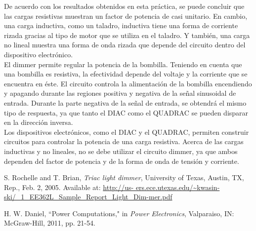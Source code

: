 \documentclass[journal]{IEEEtran}
\begin{document}
De acuerdo con los resultados obtenidos en esta práctica, 
se puede concluir que las cargas resistivas muestran 
un factor de potencia de 
casi unitario. En cambio, una carga inductiva, como un 
taladro, inductiva tiene una forma de 
corriente rizada gracias al tipo de motor que se 
utiliza en el taladro. Y también, una carga no lineal 
muestra una forma de onda rizada que depende del circuito 
dentro del dispositivo electrónico. \\

El dimmer permite regular la potencia de la bombilla. 
Teniendo en cuenta que una bombilla es resistiva, la 
efectividad depende del voltaje y la corriente que se 
encuentra en éste. El circuito controla la alimentación 
de la bombilla 
encendiendo y apagando durante las regiones positiva y 
negativa de la señal sinusoidal de entrada. Durante 
la parte negativa de la señal de entrada, se obtendrá 
el mismo tipo de respuesta, ya que tanto el DIAC como 
el QUADRAC se pueden disparar en la dirección inversa. \\

Los dispositivos electrónicos, como el DIAC y el QUADRAC, 
permiten construir circuitos para controlar la potencia 
de una carga resistiva.
Acerca de las cargas inductivas y no lineales, no se 
debe utilizar el circuito dimmer, ya que ambos dependen 
del factor de potencia y de la forma de onda de tensión 
y corriente. 

\begin{thebibliography}{1}

S. Rochelle and T. Brian, \textit{Triac light dimmer}, University of Texas, Austin, TX, Rep., Feb. 2, 2005. Available at: 
\url{http://us- ers.ece.utexas.edu/~kwasin-ski/_1_EE362L_Sample_Report_Light_Dim-mer.pdf }

H. W. Daniel, “Power Computations," in \textit{Power Electronics}, Valparaiso, IN: McGraw-Hill, 2011, pp. 21-54.

\end{thebibliography}
\end{document}

